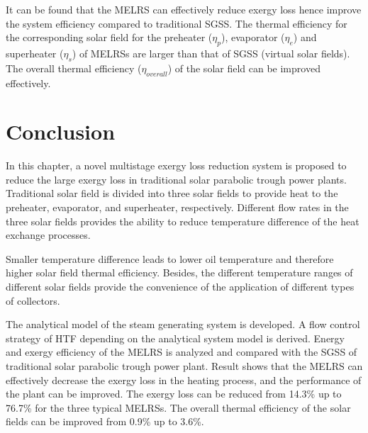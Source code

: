It can be found that the MELRS can effectively reduce exergy loss hence improve the system efficiency compared to traditional SGSS. The thermal efficiency for the corresponding solar field for the preheater ($\eta_p$), evaporator ($\eta_e$) and superheater ($\eta_s$) of MELRSs are larger than that of SGSS (virtual solar fields).
The overall thermal efficiency ($\eta_{overall}$) of the solar field can be improved effectively.

\section{Conclusion}

In this chapter, a novel multistage exergy loss reduction system is proposed to reduce the large exergy loss in traditional solar parabolic trough power plants.
Traditional solar field is divided into three solar fields to provide heat to the preheater, evaporator, and superheater, respectively. Different flow rates in the three solar fields provides the ability to reduce temperature difference of the heat exchange processes.

Smaller temperature difference leads to lower oil temperature and therefore higher solar field thermal efficiency. Besides, the different temperature ranges of different solar fields provide the convenience of the application of different types of collectors.

The analytical model of the steam generating system is developed. A flow control strategy of HTF depending on the analytical system model is derived. Energy and exergy efficiency of the MELRS is analyzed and compared with the SGSS of traditional solar parabolic trough power plant. Result shows that the MELRS can effectively decrease the exergy loss in the heating process, and the performance of the plant can be improved. The exergy loss can be reduced from 14.3\% up to 76.7\% for the three typical MELRSs. The overall thermal efficiency of the solar fields can be improved from 0.9\% up to 3.6\%.